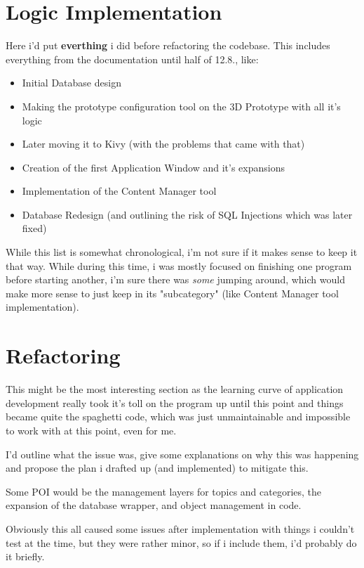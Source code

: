 \section{Logic Implementation}
Here i'd put \textbf{everthing} i did before refactoring the codebase. This includes everything from the documentation until half of 12.8., like:
\begin{itemize}
	\item Initial Database design
	\item Making the prototype configuration tool on the 3D Prototype with all it's logic 
	\item Later moving it to Kivy (with the problems that came with that)
	\item Creation of the first Application Window and it's expansions
	\item Implementation of the Content Manager tool
	\item Database Redesign (and outlining the risk of SQL Injections which was later fixed)
\end{itemize}

While this list is somewhat chronological, i'm not sure if it makes sense to keep it that way. While during this time, i was mostly focused on finishing one program before starting another, i'm sure there was \textit{some} jumping around, which would make more sense to just keep in its "subcategory" (like Content Manager tool implementation).

\section{Refactoring}

This might be the most interesting section as the learning curve of application development really took it's toll on the program up until this point and things became quite the spaghetti code, which was just unmaintainable and impossible to work with at this point, even for me.

I'd outline what the issue was, give some explanations on why this was happening and propose the plan i drafted up (and implemented) to mitigate this.

Some POI would be the management layers for topics and categories, the expansion of the database wrapper, and object management in code.

Obviously this all caused some issues after implementation with things i couldn't test at the time, but they were rather minor, so if i include them, i'd probably do it briefly.

